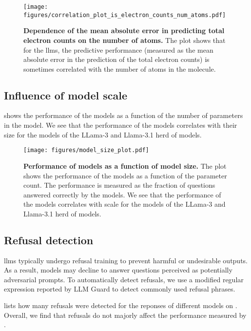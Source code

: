 \begin{figure}[!h]
    \centering
    \texttt{[image: figures/correlation\_plot\_is\_electron\_counts\_num\_atoms.pdf]}
    \caption{\textbf{Dependence of the mean absolute error in predicting total electron counts on the number of atoms.} The plot shows that for the \glspl{llm}, the predictive performance (measured as the mean absolute error in the prediction of the total electron counts) is sometimes correlated with the number of atoms in the molecule.}
    \label{fig:correlation_plot_is_electron_counts_num_atoms}
\end{figure}


\clearpage
\subsection{Influence of model scale}
 shows the performance of the models as a function of the number of parameters in the model.
We see that the performance of the models correlates with their size for the models of the LLama-3 and Llama-3.1 herd of models.

\begin{figure}[!h]
    \centering
    \texttt{[image: figures/model\_size\_plot.pdf]}
    \caption{\textbf{Performance of models as a function of model size.} The plot shows the performance of the models as a function of the parameter count. The performance is measured as the fraction of questions answered correctly by the models. We see that the performance of the models correlates with scale for the models of the LLama-3 and Llama-3.1 herd of models.}
    \label{fig:model_size_plot}
\end{figure}

\clearpage
\subsection{Refusal detection}
\Glspl{llm} typically undergo refusal training to prevent harmful or undesirable outputs. As a result, models may decline to answer questions perceived as potentially adversarial prompts.
To automatically detect refusals, we use a modified regular expression reported by LLM Guard\autocite{llmguard} to detect commonly used refusal phrases.

 lists how many refusals were detected for the reponses of different models on \chembench. Overall, we find that refusals do not majorly affect the performance measured by \chembench.


